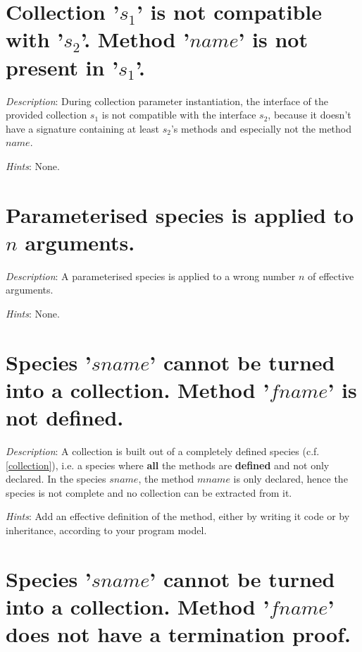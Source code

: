 \section*{Collection  '$s_1$' is not compatible with  '$s_2$'.  Method '$name$'
  is not present in '$s_1$'.}

{\em Description}:  During collection parameter instantiation, the
interface of the 
provided collection  $s_1$ is not compatible with the interface $s_2$,
because it doesn't have a signature containing at
least $s_2$'s methods and especially not the method $name$.

{\em Hints}: None.



\section*{Parameterised species is applied to $n$ arguments.}

{\em Description}: A parameterised species is applied to a wrong
number $n$ of effective arguments.

{\em Hints}: None.



\section*{Species '$sname$' cannot be turned into a collection. Method
  '$fname$' is not defined.}

{\em Description}: A collection is built  out of a  completely defined species
(c.f. \ref{collection}), i.e. a species where {\bf all} the methods
are {\bf defined} and not only declared. In the species $sname$, the
method $mname$ is only declared, hence the species is not complete and
no collection can be extracted from it.

{\em Hints}: Add an effective definition of the method, either by
writing it code or by inheritance, according to your program model.



\section*{Species '$sname$' cannot be turned into a collection. Method
  '$fname$' does not have a termination proof.}

